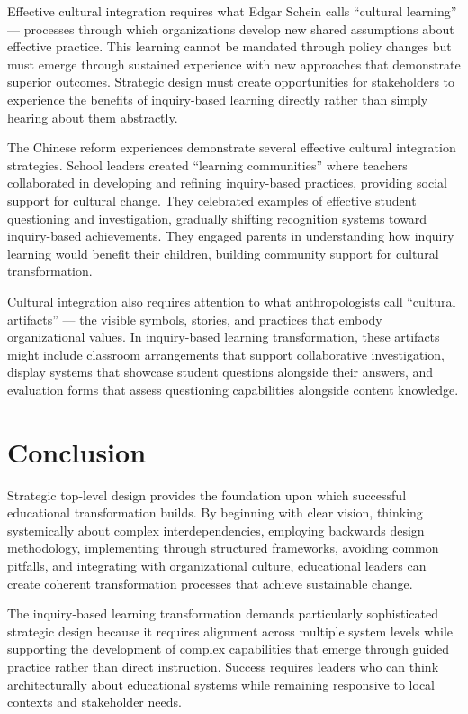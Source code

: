 \documentclass[
  Letterpaper,
]{scrbook}
\begin{document}
Effective cultural integration requires what Edgar Schein calls
``cultural learning'' --- processes through which organizations develop
new shared assumptions about effective practice. This learning cannot be
mandated through policy changes but must emerge through sustained
experience with new approaches that demonstrate superior outcomes.
Strategic design must create opportunities for stakeholders to
experience the benefits of inquiry-based learning directly rather than
simply hearing about them abstractly.

The Chinese reform experiences demonstrate several effective cultural
integration strategies. School leaders created ``learning communities''
where teachers collaborated in developing and refining inquiry-based
practices, providing social support for cultural change. They celebrated
examples of effective student questioning and investigation, gradually
shifting recognition systems toward inquiry-based achievements. They
engaged parents in understanding how inquiry learning would benefit
their children, building community support for cultural transformation.

Cultural integration also requires attention to what anthropologists
call ``cultural artifacts'' --- the visible symbols, stories, and
practices that embody organizational values. In inquiry-based learning
transformation, these artifacts might include classroom arrangements
that support collaborative investigation, display systems that showcase
student questions alongside their answers, and evaluation forms that
assess questioning capabilities alongside content knowledge.

\section{Conclusion}\label{conclusion}

Strategic top-level design provides the foundation upon which successful
educational transformation builds. By beginning with clear vision,
thinking systemically about complex interdependencies, employing
backwards design methodology, implementing through structured
frameworks, avoiding common pitfalls, and integrating with
organizational culture, educational leaders can create coherent
transformation processes that achieve sustainable change.

The inquiry-based learning transformation demands particularly
sophisticated strategic design because it requires alignment across
multiple system levels while supporting the development of complex
capabilities that emerge through guided practice rather than direct
instruction. Success requires leaders who can think architecturally
about educational systems while remaining responsive to local contexts
and stakeholder needs.
\end{document}
